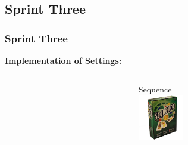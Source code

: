 \subsection{Sprint Three}
\begin{frame}
\frametitle{Sprint Three}
\textbf{Implementation of Settings:}\\
\begin{columns}
\begin{column}{0.5\textwidth}

          \begin{center}
        \end{center}
        \begin{center}
        \end{center}
\end{column}
\begin{column}{0.5\textwidth}
        \begin{center}
         \end{center}
        \begin{center}
                     {Sequence\\
                     \includegraphics[height=2cm]{images/sequence}}
        \end{center}
\end{column}
\end{columns}
\end{frame}

